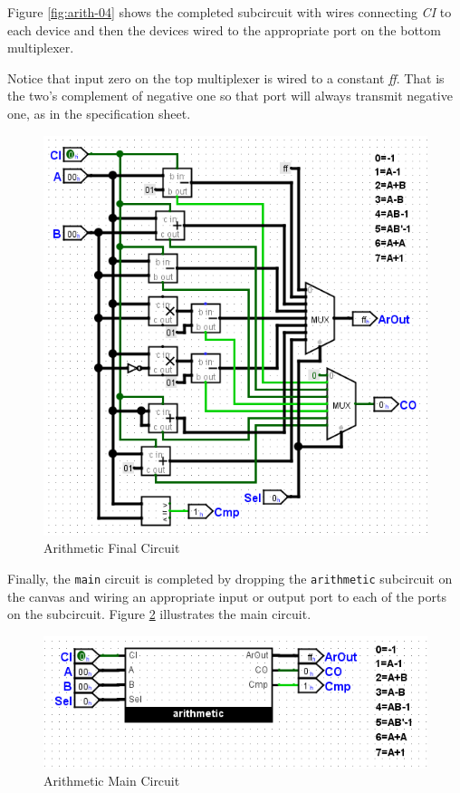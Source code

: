 Figure \ref{fig:arith-04} shows the completed subcircuit with wires connecting \textit{CI} to each device and then the devices wired to the appropriate port on the bottom multiplexer.

Notice that input zero on the top multiplexer is wired to a constant \textit{ff}. That is the two's complement of negative one so that port will always transmit negative one, as in the specification sheet. 

\begin{figure}[H]
	\centering
	\includegraphics[width=\maxwidth{.95\linewidth}]{gfx/arith-05}
	\caption{Arithmetic Final Circuit}
	\label{fig:arith-05}
\end{figure}

Finally, the \lstinline[columns=fixed]|main| circuit is completed by dropping the \lstinline[columns=fixed]|arithmetic| subcircuit on the canvas and wiring an appropriate input or output port to each of the ports on the subcircuit. Figure \ref{fig:arith-06} illustrates the main circuit.

\begin{figure}[H]
	\centering
	\includegraphics[width=\maxwidth{.95\linewidth}]{gfx/arith-06}
	\caption{Arithmetic Main Circuit}
	\label{fig:arith-06}
\end{figure}

